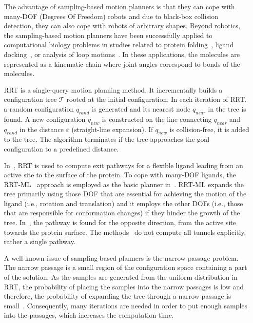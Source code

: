 \documentclass[usletter, 10pt, conference]{svjour3}      %
\def\qrand{q_{rand}}
\def\qnear{q_{near}}
\def\qnew{q_{new}}
\def\T{\mathcal{T}}
\begin{document}
The advantage of sampling-based motion planners is that they can cope with many-DOF (Degrees Of Freedom) robots and due to black-box collision detection, they can also cope with robots of arbitrary shapes.
Beyond robotics, the sampling-based motion planners have been successfully applied to computational biology problems in studies related to protein folding~\cite{bayazit2001ligand,al2012motion,cortes2010simulating,amato2002using,raveh2009rapid,novinskaya2015improving,songPFintro,kirillova2008an}, ligand docking~\cite{cortes2010simulating,latombe1999motion,mollProt}, or analysis of loop motions~\cite{cortes2004geometric}.
In these applications, the molecules are represented as a kinematic chain where joint angles correspond to bonds of the molecules.

RRT is a single-query motion planning method.
It incrementally builds a configuration tree $\T$ rooted at the initial configuration.
In each iteration of RRT, a random configuration $\qrand$ is generated and its nearest node $\qnear$ in the tree  is found.
A new configuration $\qnew$ is constructed on the line connecting $\qnear$ and $\qrand$ in the distance $\varepsilon$ (straight-line expansion).
If $\qnew$ is collision-free, it is added to the tree.
The algorithm terminates if the tree approaches the goal configuration to a predefined distance.

In~\cite{guieysse2008structure,cortes2010simulating}, RRT is used to compute exit pathways for a flexible ligand leading from an active site to the surface of the protein.
To cope with many-DOF ligands, the RRT-ML~\cite{cortes2007mlrrt} approach is employed as the basic planner in~\cite{cortes2010simulating}.
RRT-ML expands the tree primarily using those DOF that are essential for achieving the motion of the ligand (i.e., rotation
and translation) and it employs the other DOFs (i.e., those that are responsible for conformation changes) if they hinder the growth of the tree.
In~\cite{cortesMD}, the pathway is found for the opposite direction, from the active site towards the protein surface.
The methods~\cite{guieysse2008structure,cortesMD} do not compute all tunnels explicitly, rather a single pathway.

A well known issue of sampling-based planners is the narrow passage problem.
The narrow passage is a small region of the configuration space containing a part of the solution.
As the samples are generated from the uniform distribution in RRT, the probability of placing the samples into the narrow passages is low and therefore, the probability of expanding the tree through a narrow passage is small~\cite{hannaWIS}.
Consequently, many iterations are needed in order to put enough samples into the passages, which increases the computation time.
\end{document}
